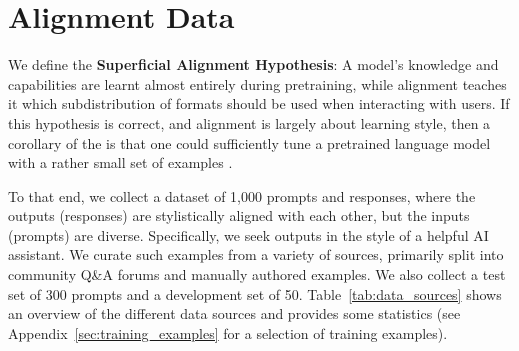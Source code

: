 \section{Alignment Data}
\label{sec:data}

We define the \textbf{Superficial Alignment Hypothesis}:
A model's knowledge and capabilities are learnt almost entirely during pretraining, while alignment teaches it which subdistribution of formats should be used when interacting with users.
If this hypothesis is correct, and alignment is largely about learning style, then a corollary of the \hypothesis{} is that one could sufficiently tune a pretrained language model with a rather small set of examples \citep{kirstain2021examples}.

To that end, we collect a dataset of 1,000 prompts and responses, where the outputs (responses) are stylistically aligned with each other, but the inputs (prompts) are diverse.
Specifically, we seek outputs in the style of a helpful AI assistant.
We curate such examples from a variety of sources, primarily split into community Q\&A forums and manually authored examples.
We also collect a test set of 300 prompts and a development set of 50.
Table~\ref{tab:data_sources} shows an overview of the different data sources and provides some statistics (see Appendix~\ref{sec:training_examples} for a selection of training examples).%

